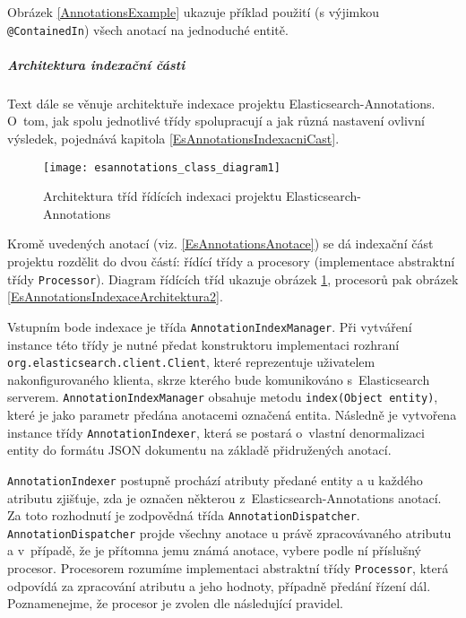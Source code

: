 \documentclass[11pt,oneside]{fithesis2}
\begin{document}
Obrázek \ref{AnnotationsExample} ukazuje příklad použití (s výjimkou \texttt{@ContainedIn}) všech anotací na jednoduché entitě.

\subparagraph{Architektura indexační části}
Text dále se věnuje architektuře indexace projektu Elasticsearch-Annotations. O~tom, jak spolu jednotlivé třídy spolupracují a jak různá nastavení ovlivní výsledek, pojednává kapitola \ref{EsAnnotationsIndexacniCast}.

\begin{figure}[h]
	\begin{center}
		\texttt{[image: esannotations\_class\_diagram1]}
	\end{center}
	\caption{Architektura tříd řídících indexaci projektu Elasticsearch-Annotations}	
	\label{EsAnnotationsIndexaceArchitektura1}
\end{figure}

Kromě uvedených anotací (viz. \ref{EsAnnotationsAnotace}) se dá indexační část projektu rozdělit do dvou částí: řídící třídy a procesory (implementace abstraktní třídy \texttt{Processor}). Diagram řídících tříd ukazuje obrázek \ref{EsAnnotationsIndexaceArchitektura1}, procesorů pak obrázek \ref{EsAnnotationsIndexaceArchitektura2}.

Vstupním bode indexace je třída \texttt{AnnotationIndexManager}. Při vytváření instance této třídy je nutné předat konstruktoru implementaci rozhraní \texttt{org.elasticsearch.client.Client}, které reprezentuje uživatelem nakonfigurovaného klienta, skrze kterého bude komunikováno s~Elasticsearch serverem. \texttt{AnnotationIndexManager} obsahuje metodu \texttt{index(Object entity)}, které je jako parametr předána anotacemi označená entita. Následně je vytvořena instance třídy \texttt{AnnotationIndexer}, která se postará o~vlastní denormalizaci entity do formátu JSON dokumentu na základě přidružených anotací.

\texttt{AnnotationIndexer} postupně prochází atributy předané entity a u každého atributu zjišťuje, zda je označen některou z~Elasticsearch-Annotations anotací. Za toto rozhodnutí je zodpovědná třída \texttt{AnnotationDispatcher}. \texttt{AnnotationDispatcher} projde všechny anotace u právě zpracovávaného atributu a v~případě, že je přítomna jemu známá anotace, vybere podle ní příslušný procesor. Procesorem rozumíme implementaci abstraktní třídy \texttt{Processor}, která odpovídá za  zpracování atributu a jeho hodnoty, případně předání řízení dál. Poznamenejme, že procesor je zvolen dle následující pravidel.
\end{document}
